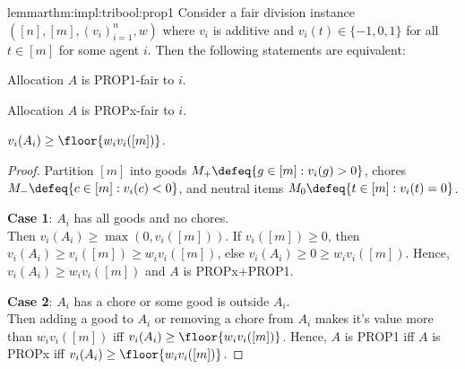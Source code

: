 \begin{restatable}{lemma}{rthm:impl:tribool:prop1}
\label{thm:impl:tribool:prop1}
Consider a fair division instance $([n], [m], (v_i)_{i=1}^n, w)$ where
$v_i$ is additive and $v_i(t) \in \{-1, 0, 1\}$ for all $t \in [m]$ for some agent $i$.
Then the following statements are equivalent:
\begin{tightenum}
\item Allocation $A$ is PROP1-fair to $i$.
\item Allocation $A$ is PROPx-fair to $i$.
\item $v_i(A_i) \ge \floor{w_iv_i([m])}$.
\end{tightenum}
\end{restatable}
\begin{proof}
Partition $[m]$ into
goods $M_+ \defeq \{g \in [m]: v_i(g) > 0\}$,
chores $M_- \defeq \{c \in [m]: v_i(c) < 0\}$,
and neutral items $M_0 \defeq \{t \in [m]: v_i(t) = 0\}$.

\textbf{Case 1}: $A_i$ has all goods and no chores.
\\ Then $v_i(A_i) \ge \max(0, v_i([m]))$.
If $v_i([m]) \ge 0$, then $v_i(A_i) \ge v_i([m]) \ge w_iv_i([m])$,
else $v_i(A_i) \ge 0 \ge w_iv_i([m])$.
Hence, $v_i(A_i) \ge w_iv_i([m])$ and $A$ is PROPx+PROP1.

\textbf{Case 2}: $A_i$ has a chore or some good is outside $A_i$.
\\ Then adding a good to $A_i$ or removing a chore from $A_i$
makes it's value more than $w_iv_i([m])$ iff $v_i(A_i) \ge \floor{w_iv_i([m])}$.
Hence, $A$ is PROP1 iff $A$ is PROPx iff $v_i(A_i) \ge \floor{w_iv_i([m])}$.
\end{proof}

